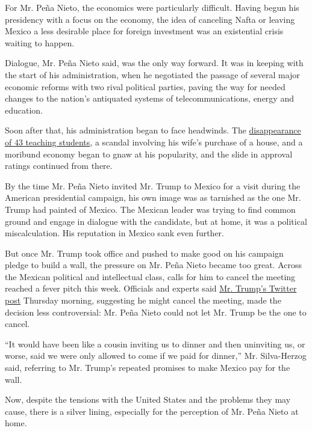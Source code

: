 For Mr. Peña Nieto, the economics were particularly difficult. Having
begun his presidency with a focus on the economy, the idea of canceling
Nafta or leaving Mexico a less desirable place for foreign investment
was an existential crisis waiting to happen.

Dialogue, Mr. Peña Nieto said, was the only way forward. It was in
keeping with the start of his administration, when he negotiated the
passage of several major economic reforms with two rival political
parties, paving the way for needed changes to the nation's antiquated
systems of telecommunications, energy and education.

Soon after that, his administration began to face headwinds. The
\href{https://www.nytimes3xbfgragh.onion/2016/04/25/world/americas/missing-mexican-students-suffered-a-night-of-terror-investigators-say.html}{disappearance
of 43 teaching students}, a scandal involving his wife's purchase of a
house, and a moribund economy began to gnaw at his popularity, and the
slide in approval ratings continued from there.

By the time Mr. Peña Nieto invited Mr. Trump to Mexico for a visit
during the American presidential campaign, his own image was as
tarnished as the one Mr. Trump had painted of Mexico. The Mexican leader
was trying to find common ground and engage in dialogue with the
candidate, but at home, it was a political miscalculation. His
reputation in Mexico sank even further.

But once Mr. Trump took office and pushed to make good on his campaign
pledge to build a wall, the pressure on Mr. Peña Nieto became too great.
Across the Mexican political and intellectual class, calls for him to
cancel the meeting reached a fever pitch this week. Officials and
experts said
\href{https://twitter.com/realDonaldTrump/status/824616644370714627}{Mr.
Trump's Twitter post} Thursday morning, suggesting he might cancel the
meeting, made the decision less controversial: Mr. Peña Nieto could not
let Mr. Trump be the one to cancel.

``It would have been like a cousin inviting us to dinner and then
uninviting us, or worse, said we were only allowed to come if we paid
for dinner,'' Mr. Silva-Herzog said, referring to Mr. Trump's repeated
promises to make Mexico pay for the wall.

Now, despite the tensions with the United States and the problems they
may cause, there is a silver lining, especially for the perception of
Mr. Peña Nieto at home.

